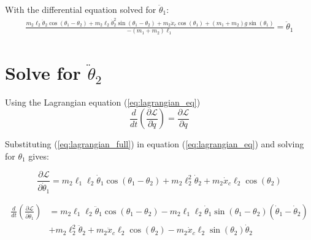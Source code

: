 \documentclass[10pt]{article}
\begin{document}
    With the differential equation solved for $\ddot \theta_1$:
    \begin{equation}
        \begin{aligned}
            \frac{m_2\ell_2\ddot\theta_2\cos(\theta_1 - \theta_2)  +m_2\ell_2\dot\theta_2^2\sin(\theta_1-\theta_2)
            +   m_2\ddot x_c\cos(\theta_1) + (m_1 + m_2)g\sin(\theta_1)}{-(m_1 + m_2)\ell_1} = \ddot \theta_1
        \end{aligned}
    \end{equation}  
    





    
    \pagebreak
    \section{Solve for $\ddot \theta_2$}

    Using the Lagrangian equation (\ref{eq:lagrangian_eq})
    \begin{equation} \label{eq:lagrangian_eq}
        \frac{d}{dt} \left(\frac{\partial \mathcal{L}}{\partial \dot q} \right) = 
        \frac{\partial \mathcal{L}}{\partial q}
    \end{equation}

    Substituting (\ref{eq:lagrangian_full}) in equation (\ref{eq:lagrangian_eq}) and solving for $\theta_1$ gives:

    \begin{equation} \label{eq: lagrange Step1}
        \frac{\partial \mathcal{L}}{\partial \dot\theta_1} = 
        m_2 \ell_1 \ell_2 \dot \theta_1 \cos(\theta_1 - \theta_2)
        + m_2\ell_2^2 \dot\theta_2 
        + m_2 \dot x_c \ell_2 \cos(\theta_2)
    \end{equation}

    \begin{equation} \label{eq: lagrange Step2}
        \begin{aligned}
        \frac{d}{dt} \left(\frac{\partial \mathcal{L}}{\partial \dot\theta_1}\right) &= 
        m_2 \ell_1 \ell_2 \ddot \theta_1 \cos(\theta_1 - \theta_2) - m_2 \ell_1 \ell_2 \dot \theta_1 \sin(\theta_1 - \theta_2)(\dot \theta_1 - \dot \theta_2)\\
        &+m_2\ell_2^2 \ddot \theta_2 + m_2 \ddot x_c \ell_2 \cos(\theta_2) - m_2 \dot x_c \ell_2 \sin(\theta_2)\dot\theta_2
        \end{aligned}
    \end{equation}
\end{document}
